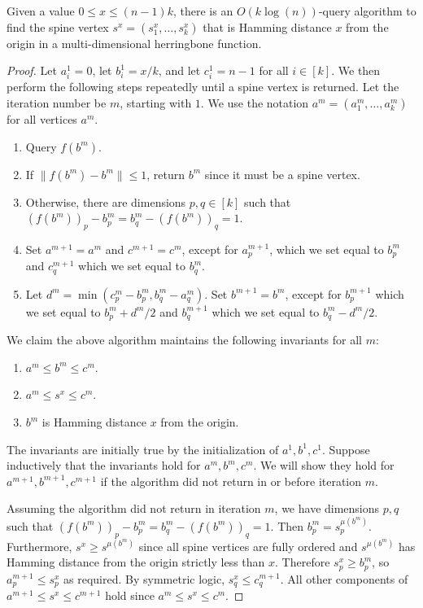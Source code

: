 \documentclass[11pt]{article}
\begin{document}
\begin{lemma}
    \label{lem:general-herringbone-spine-find-Hamming}
    Given a value $0 \le x \le (n-1)k$, there is an $O(k\log(n))$-query algorithm to find the spine vertex $s^x = (s^x_1, \ldots, s^x_k)$ that is Hamming distance $x$ from the origin in a multi-dimensional herringbone function.
\end{lemma}
\begin{proof}
    Let $a^1_i = 0$, let $b^1_i = x/k$, and let $c^1_i = n-1$ for all $i \in [k]$.
    We then perform the following steps repeatedly until a spine vertex is returned.
    Let the iteration number be $m$, starting with $1$.
    We use the notation $a^m = (a^m_1, \ldots, a^m_k)$ for all vertices $a^m$.
    \begin{enumerate}
        \item Query $f(b^m)$.
        \item If $\|f(b^m)-b^m\| \le 1$, return $b^m$ since it must be a spine vertex.
        \item Otherwise, there are dimensions $p,q \in [k]$ such that $(f(b^m))_p - b^m_p = b^m_q - (f(b^m))_q = 1$.
        \item Set $a^{m+1} = a^m$ and $c^{m+1} = c^m$, except for $a^{m+1}_p$, which we set equal to $b^m_p$ and $c^{m+1}_q$ which we set equal to $b^m_q$.
        \item Let $d^m = \min(c^m_p-b^m_p, b^m_q-a^m_q)$. Set $b^{m+1} = b^m$, except for $b^{m+1}_p$ which we set equal to $b^m_p + d^m/2$ and $b^{m+1}_q$ which we set equal to $b^m_q - d^m/2$.
    \end{enumerate}

    We claim the above algorithm maintains the following invariants for all $m$:
    \begin{enumerate}
        \item $a^m \le b^m \le c^m$.
        \item $a^m \le s^x \le c^m$.
        \item $b^m$ is Hamming distance $x$ from the origin.
    \end{enumerate}
    The invariants are initially true by the initialization of $a^1, b^1, c^1$.
    Suppose inductively that the invariants hold for $a^m, b^m, c^m$.
    We will show they hold for $a^{m+1}, b^{m+1}, c^{m+1}$ if the algorithm did not return in or before iteration $m$.
    
    Assuming the algorithm did not return in iteration $m$, we have dimensions $p,q$ such that $(f(b^m))_p - b^m_p = b^m_q - (f(b^m))_q = 1$.
    Then $b^m_p = s^{\mu(b^m)}_p$.
    Furthermore, $s^x \ge s^{\mu(b^m)}$ since all spine vertices are fully ordered and $s^{\mu(b^m)}$ has Hamming distance from the origin strictly less than $x$.
    Therefore $s^x_p \ge b^m_p$, so $a^{m+1}_p \le s^x_p$ as required.
    By symmetric logic, $s^x_q \le c^{m+1}_q$.
    All other components of $a^{m+1} \le s^x \le c^{m+1}$ hold since $a^m \le s^x \le c^m$.


\end{proof}
\end{document}

